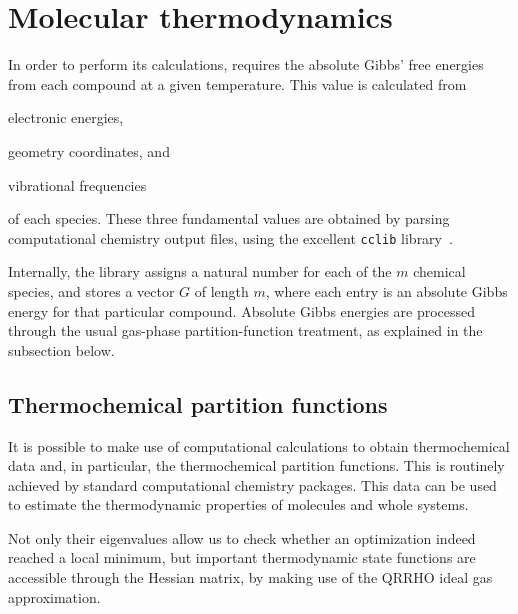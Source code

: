 \section{Molecular thermodynamics}

In order to perform its calculations,
\overreact{} requires the absolute Gibbs' free energies from each compound at a given temperature.
This value is calculated from
\begin{enumerate*}
	\item electronic energies,
	\item geometry coordinates,
	      and
	\item vibrational frequencies
\end{enumerate*}
of each species.
These three fundamental values are obtained
by parsing computational chemistry output files,
using the excellent \texttt{cclib} library~\cite{O_boyle_2008}.

Internally,
the library assigns a natural number for each of the $m$ chemical species,
and stores a vector $G$ of length $m$,
where each entry is an absolute Gibbs energy for that particular compound.
Absolute Gibbs energies are processed through the usual gas-phase partition-function treatment,
as explained in the subsection below.

\subsection{Thermochemical partition functions}

It is possible to make use of computational calculations to obtain
thermochemical data and,
in particular,
the thermochemical partition
functions.
This is routinely achieved by standard computational chemistry packages.
This data can be used to estimate the thermodynamic properties of molecules and
whole systems.

Not only their eigenvalues allow us to check whether an optimization indeed reached a local minimum,
but important thermodynamic state functions are accessible through the Hessian matrix,
by making use of the QRRHO ideal gas approximation.

